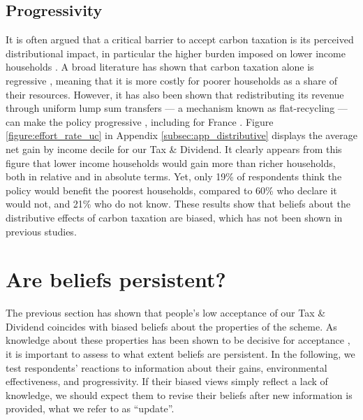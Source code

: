 \documentclass[11pt]{article}
\begin{document}
    \subsection{Progressivity}
It is often argued that a critical barrier to accept carbon taxation is its perceived distributional impact, in particular the higher burden imposed on lower income households \citep{bristow_public_2010,brannlund_tax_2012,gevrek_public_2015}. A broad literature has shown that carbon taxation alone is regressive \citep{poterba_is_1991,metcalf_distributional_1999,grainger_who_2010}, meaning that it is more costly for poorer households as a share of their resources. However, it has also been shown that redistributing its revenue through uniform lump sum transfers --- a mechanism known as flat-recycling --- can make the policy progressive \citep{west_williams_04,bento_distributional_2009,williams_initial_2015}, including for France \citep{bureau_distributional_2011,douenne_vertical_2018}. Figure \ref{figure:effort_rate_uc} in Appendix \ref{subsec:app_distributive} displays the average net gain by income decile for our Tax \& Dividend. It clearly appears from this figure that lower income households would gain more than richer households, both in relative and in absolute terms. Yet, only 19\% of respondents think the policy would benefit the poorest households, compared to 60\% who declare it would not, and 21\% who do not know. These results show that beliefs about the distributive effects of carbon taxation are biased, which has not been shown in previous studies. 

\section{Are beliefs persistent? \label{sec:persistence}}

The previous section has shown that people's low acceptance of our Tax \& Dividend coincides with biased beliefs about the properties of the scheme. As knowledge about these properties has been shown to be decisive for acceptance \citep{carattini_overcoming_2018}, it is important to assess to what extent beliefs are persistent. In the following, we test respondents' reactions to information about their gains, environmental effectiveness, and progressivity. If their biased views simply reflect a lack of knowledge, we should expect them to revise their beliefs after new information is provided, what we refer to as ``update''. %
\end{document}
